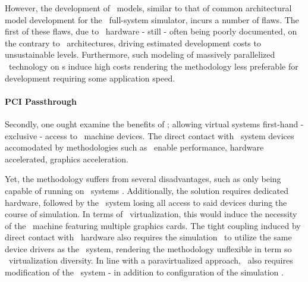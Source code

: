 However, the development of \dvttermgpu\ models, similar to that of common architectural model development for the \dvttermsimics\ full-system simulator, incurs a number of flaws.
The first of these flaws, due to \dvttermgpu\ hardware - still - often being poorly documented, on the contrary to \dvttermcpu\ architectures, driving estimated development costs to unsustainable levels.
Furthermore, such modeling of massively parallelized \dvttermgpu\ technology on \dvttermcpu s induce high costs rendering the methodology less preferable for development requiring some application speed.

\paragraph{PCI Passthrough}
\label{par:analysis_pcipassthrough}
Secondly, one ought examine the benefits of \dvttermpcipassthrough ; allowing virtual systems first-hand - exclusive - access to \dvttermhost\ machine devices.
The direct contact with \dvttermhost\ system devices accomodated by methodologies such as \dvttermpcipassthrough\ enable performance, hardware accelerated, graphics acceleration.

Yet, the methodology suffers from several disadvantages, such as only being capable of running on \dvttermlinux\ systems .
Additionally, the solution requires dedicated hardware, followed by the \dvttermhost\ system losing all access to said devices during the course of simulation.
In terms of \dvttermgpu\ virtualization, this would induce the necessity of the \dvttermhost\ machine featuring multiple graphics cards.
The tight coupling induced by direct contact with \dvttermhost\ hardware also requires the simulation \dvttermtarget\ to utilize the same device drivers as the \dvttermhost\ system, rendering the methodology unflexible in term so \dvttermgpu\ virtualization diversity.
In line with a paravirtualized approach, \dvttermpcipassthrough\ also requires modification of the \dvttermtarget\ system - in addition to configuration of the simulation \dvttermhost .


